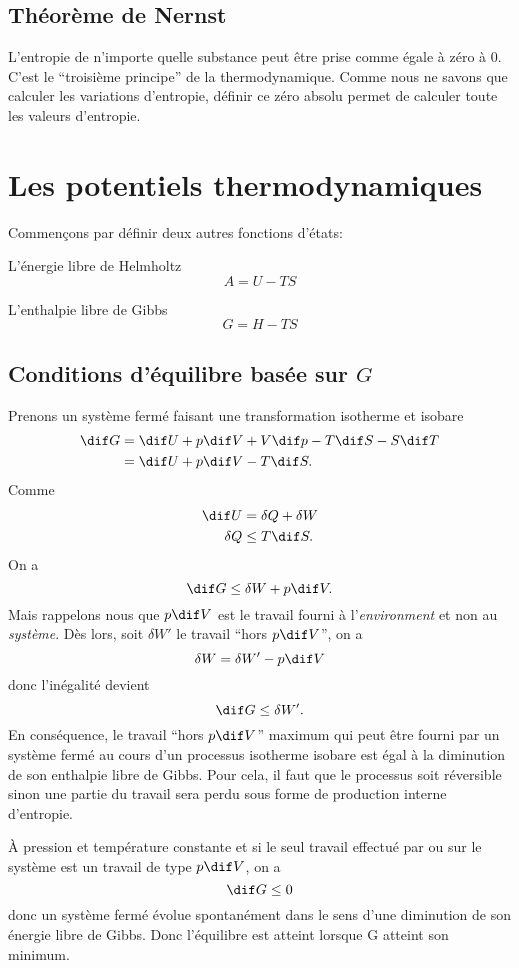 \subsection{Théorème de Nernst}
L'entropie de n'importe quelle substance peut être prise
comme égale à zéro à \si{0}{\kelvin}.
C'est le ``troisième principe'' de la thermodynamique.
Comme nous ne savons que calculer les variations d'entropie,
définir ce zéro absolu permet de calculer toute les valeurs d'entropie.

\section{Les potentiels thermodynamiques}
Commençons par définir deux autres fonctions d'états:

L'énergie libre de Helmholtz
\[ A = U - TS \]

L'enthalpie libre de Gibbs
\[ G = H - TS \]

\subsection{Conditions d'équilibre basée sur $G$}
Prenons un système fermé faisant une transformation isotherme et isobare
\begin{align*}
  \dif G & = \dif U+p\dif V+V\dif p-T\dif S-S\dif T\\
  & = \dif U+p\dif V-T\dif S.
\end{align*}
Comme
\begin{align*}
  \dif U & = \delta Q + \delta W\\
  \delta Q & \leq T\dif S.
\end{align*}
On a
\[ \dif G \leq \delta W + p\dif V. \]
Mais rappelons nous que $p\dif V$ est le travail fourni à l'\emph{environment}
et non au \emph{système}.
Dès lors, soit $\delta W'$ le travail ``hors $p \dif V$'', on a
\[ \delta W = \delta W' - p \dif V \]
donc l'inégalité devient
\[ \dif G \leq \delta W'. \]
En conséquence, le travail ``hors $p\dif V$'' maximum qui peut être fourni
par un système fermé au cours d'un processus isotherme isobare est égal
à la diminution de son enthalpie libre de Gibbs.
Pour cela, il faut que le processus soit réversible sinon une partie
du travail sera perdu sous forme de production interne d'entropie.

À pression et température constante et si le seul travail effectué par
ou sur le système est un travail de type $p\dif V$, on a
\[ \dif G \leq 0 \]
donc un système fermé évolue spontanément dans le sens
d'une diminution de son énergie libre de Gibbs.
Donc l'équilibre est atteint lorsque G atteint son minimum.

